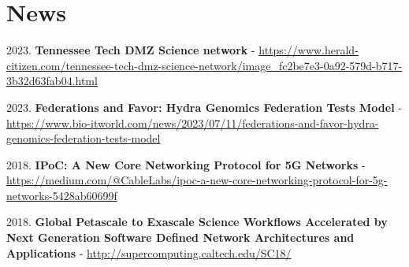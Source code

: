 \section{News}


\begin{cvlist}

    \item {2023.}  \textbf{Tennessee Tech DMZ Science network} - \url{https://www.herald-citizen.com/tennessee-tech-dmz-science-network/image_fc2be7e3-0a92-579d-b717-3b32d63fab04.html}

\item {2023.} \textbf{ Federations and Favor: Hydra Genomics Federation Tests Model}  - \url{https://www.bio-itworld.com/news/2023/07/11/federations-and-favor-hydra-genomics-federation-tests-model}

    
    \item {2018.} \textbf{IPoC: A New Core Networking Protocol for 5G Networks} - \url{https://medium.com/@CableLabs/ipoc-a-new-core-networking-protocol-for-5g-networks-5428ab60699f}
    
    \item {2018.} \textbf{Global Petascale to Exascale Science Workflows Accelerated by Next Generation Software Defined Network Architectures and Applications}  - \url{http://supercomputing.caltech.edu/SC18/}
    
\end{cvlist}
